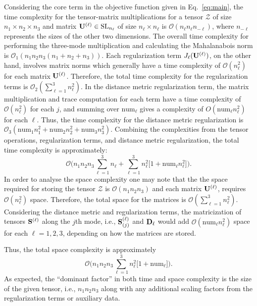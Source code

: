 \documentclass{article}
\newcommand{\SL}{\operatorname{SL}}
\newcommand{\T}{\mathcal}
\newcommand{\m}[1]{{\bf{#1}}}
\begin{document}
Considering the core term in the  objective function given in Eq.~\eqref{eq:main}, the time complexity for the tensor-matrix multiplications for a tensor \(\T Z\) of size \(n_1 \times n_2 \times n_3\) and matrix \(\m U^{(\ell)}\in \SL_{n_\ell}\) of size \(n_{\ell} \times n_{\ell}\) is \(\mathcal O(n_{\ell} n_{\ell} n_{- \ell})\), where \(n_{- \ell}\) represents the sizes of the other two dimensions. The overall time complexity for performing the three-mode multiplication and calculating the Mahalanabois norm is \(\mathcal O_1(n_1 n_2 n_3 (n_1 + n_2 + n_3)).\)
Each regularization term \(J_\ell(\m U^{(\ell)})\), on the other hand, involves matrix norms which generally have a time complexity of \(\mathcal O(n_\ell^2)\) for each matrix \(\m U^{(\ell)}\). Therefore, the total time complexity for the regularization terms is \(\mathcal O_2(\sum\limits_{\ell=1}^3 n_\ell^2 ).\) In the distance metric regularization term, the matrix multiplication and trace computation for each term have a time complexity of \(\mathcal O(n_\ell^2)\) for each \(j\), and summing over \(\text{num}_\ell\) gives a complexity of \(O(\text{num}_\ell n_\ell^2)\) for each \(\ell\). Thus, the time complexity for the distance metric regularization is \(
   \mathcal O_3(\text{num}_1 n_1^2 + \text{num}_2 n_2^2 + \text{num}_3 n_3^2).
   \)
Combining the complexities from the tensor operations, regularization terms, and distance metric regularization, the total time complexity is approximately:
\begin{equation}
  \mathcal O\bigg (n_1 n_2 n_3 \sum\limits_{\ell=1}^3 n_\ell  + \sum\limits_{\ell=1}^3 n_\ell^2 \big[ 1 + \text{num}_\ell n_\ell^2 \big ]\bigg).   \nonumber
\end{equation}
In order to analyse the space complexity one may note that the the space required for storing the tensor \(\T Z\) is \(\mathcal O(n_1 n_2 n_3)\) and each matrix \(\m U^{(\ell)}\), requires \(\mathcal O(n^2_\ell)\) space. Therefore, the total space for the matrices is \(\mathcal O(\sum\limits_{\ell=1}^3 n_\ell^2)\).\\
Considering the distance metric and regularization terms, the matricization of tensors \(\m S^{(\ell)}\) along the $j$th mode, i.e., \(\m S^{(\ell)}_{(j)}\) and \(\m D_\ell\) would add \(\mathcal O(\text{num}_\ell n_\ell^2)\) space for each \(\ell=1, 2,3\), depending on how the matrices are stored.

Thus, the total space complexity is approximately
\begin{equation}
 \mathcal O\bigg (n_1 n_2 n_3\sum\limits_{\ell=1}^3  n^2_\ell\big[1+  \text{num}_\ell\big]\bigg).  \nonumber 
\end{equation}
As expected, the ``dominant factor'' in both time and space complexity is the size of the given tensor, i.e., \(n_1 n_2 n_3\) along with any additional scaling factors from the regularization terms or auxiliary data.
\end{document}
